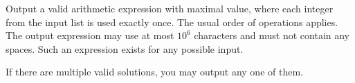 
  Output a valid arithmetic expression with maximal value, where each integer from the input list is used exactly once.
  The usual order of operations applies.
  The output expression may use at most $10^6$ characters and must not contain any spaces.
  Such an expression exists for any possible input.

  If there are multiple valid solutions, you may output any one of them.
